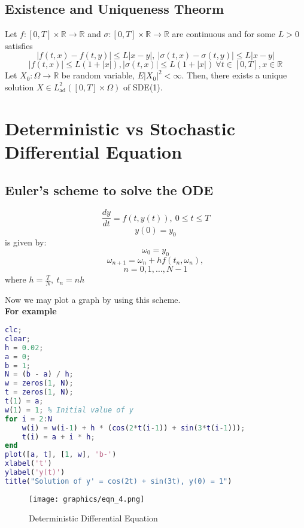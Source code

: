 \documentclass[twoside,final]{hcmut-report}
\begin{document}
\subsection{Existence and Uniqueness Theorm}
   Let $f \colon [0,T] \times \mathbb{R} \rightarrow \mathbb{R}$ and $\sigma \colon [0,T] \times \mathbb{R} \rightarrow \mathbb{R}$ are continuous and for some $L > 0$ satisfies 
    \[ \left|f(t,x) - f(t,y)\right| \leq L\left|x-y\right|, \ \left|\sigma(t,x) - \sigma(t,y)\right| \leq L\left|x-y\right|\]
    \[ \left|f(t,x)\right| \leq L(1+\left|x\right|) ,\left|\sigma(t,x)\right| \leq L(1+\left|x\right|) \ \forall t \in [0,T], x \in \mathbb{R}\]
    Let $X_0 \colon \Omega \rightarrow \mathbb{R}$ be random variable, ${E}\left|X_0\right|^2 < \infty $. Then, there exists a unique solution $X \in L^2_\text{ad}([0,T] \times \Omega)$ of SDE(1).


\pagebreak
\section{Deterministic vs Stochastic Differential Equation}

\subsection{Euler's scheme to solve the ODE}

\[\frac{dy}{dt} = f(t,y(t)),\ 0 \leq t \leq T\]
      \[y(0) = y_0\]
      is given by:
      \[\omega_0 = y_0\]
      \[\omega_{n+1} = \omega_n + hf(t_n,\omega_n),\]
      \[n=0,1,\dots,N-1\] 
      where $h=\frac{T}{N}, \ t_n = nh$

      Now we may plot a graph by using this scheme.\\

      \textbf{For example}
      \begin{lstlisting}[language=Matlab, caption={My MATLAB Code}, label={lst:matlabcode}]
clc;
clear;
h = 0.02;
a = 0;
b = 1;
N = (b - a) / h;
w = zeros(1, N);
t = zeros(1, N);
t(1) = a;
w(1) = 1; % Initial value of y
for i = 2:N
    w(i) = w(i-1) + h * (cos(2*t(i-1)) + sin(3*t(i-1)));
    t(i) = a + i * h;
end
plot([a, t], [1, w], 'b-')
xlabel('t')
ylabel('y(t)')
title("Solution of y' = cos(2t) + sin(3t), y(0) = 1")

\end{lstlisting}
       \begin{figure}[h]
      \centering
                    \texttt{[image: graphics/eqn\_4.png]}
                    \caption{Deterministic Differential Equation}
\end{figure}
      
\end{document}
